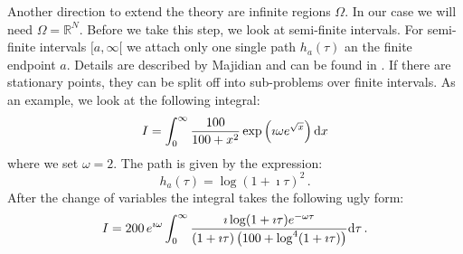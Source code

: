 \documentclass[a4paper,10pt]{article}
\begin{document}
Another direction to extend the theory are infinite regions $\Omega$. In our case we will
need $\Omega = \mathbb{R}^N$. Before we take this step, we look at semi-finite intervals.
For semi-finite intervals $[a, \infty [$ we attach only one single path $h_a(\tau)$ an the
finite endpoint $a$. Details are described by Majidian and can be found in \cite{H_nsd_sii}. If there
are stationary points, they can be split off into sub-problems over finite intervals.
As an example, we look at the following integral:
\begin{equation}
  I = \int_0^\infty \frac{100}{100 + x^2} \exp\left(\imath \omega e^{\sqrt{x}}\right) \mathrm{d}x
\end{equation}
where we set $\omega = 2$. The path is given by the expression:
\begin{equation}
  h_a(\tau) = \log(1 + \imath\tau)^2 \,.
\end{equation}
After the change of variables the integral takes the following ugly form:
\begin{equation}
  I = 200 \, e^{\imath \omega}
      \int_0^{\infty}
        \frac{\imath \log(1+\imath\tau) e^{-\omega\tau}}
             {(1 + \imath\tau)\left(100+\log^4(1+\imath\tau)\right)}
      \mathrm{d}\tau \,.
\end{equation}
\end{document}

